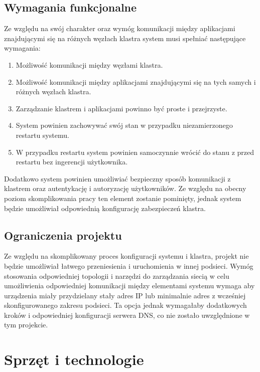 \documentclass[12pt]{report}
\let\Oldsection\section
\renewcommand{\section}{\FloatBarrier\Oldsection}
\let\Oldsubsection\subsection
\renewcommand{\subsection}{\FloatBarrier\Oldsubsection}
\begin{document}
{\subsection{Wymagania funkcjonalne}
Ze względu na swój charakter oraz wymóg komunikacji między aplikacjami znajdującymi się na różnych węzłach klastra system musi spełniać następujące wymagania:

\begin{enumerate}
\item{Możliwość komunikacji między węzłami klastra.}
\item{Możliwość komunikacji między aplikacjami znajdującymi się na tych samych i różnych węzłach klastra.}
\item{Zarządzanie klastrem i aplikacjami powinno być proste i przejrzyste.}
\item{System powinien zachowywać swój stan w przypadku niezamierzonego restartu systemu.}
\item{W przypadku restartu system powinien samoczynnie wrócić do stanu z przed restartu bez ingerencji użytkownika.}
\end{enumerate}

Dodatkowo system powinien umożliwiać bezpieczny sposób komunikacji z klastrem oraz autentykację i autoryzację użytkowników. Ze względu na obecny poziom skomplikowania pracy ten element zostanie pominięty, jednak system będzie umożliwiał odpowiednią konfigurację zabezpieczeń klastra.
\subsection{Ograniczenia projektu}
Ze względu na skomplikowany proces konfiguracji systemu i klastra, projekt nie będzie umożliwiał łatwego przeniesienia i uruchomienia w innej podsieci. Wymóg stosowania odpowiedniej topologii i narzędzi do zarządzania siecią w celu umożliwienia odpowiedniej komunikacji między elementami systemu wymaga aby urządzenia miały przydzielany stały adres IP lub minimalnie adres z wcześniej skonfigurowanego zakresu podsieci. Ta opcja jednak wymagałaby dodatkowych kroków i odpowiedniej konfiguracji serwera DNS, co nie zostało uwzględnione w tym projekcie.

\section{Sprzęt i technologie}
}
\end{document}

